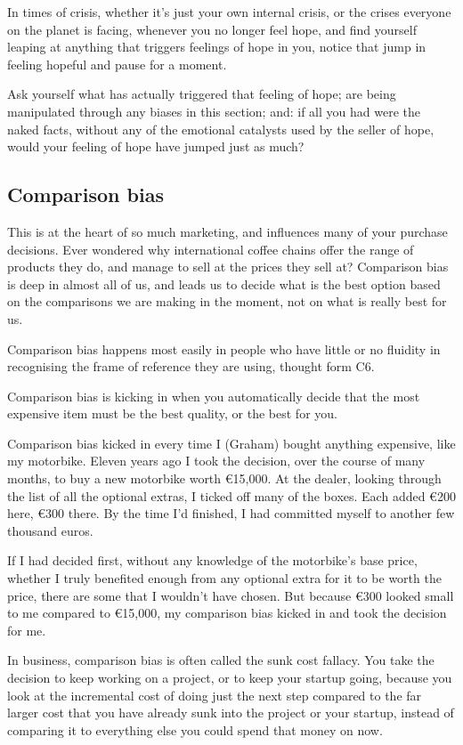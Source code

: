 In times of crisis, whether it's just your own internal crisis, or the crises everyone on the planet is facing, whenever you no longer feel hope, and find yourself leaping at anything that triggers feelings of hope in you, notice that jump in feeling hopeful and pause for a moment. 


Ask yourself what has actually triggered that feeling of hope; are being manipulated through any biases in this section; and: if all you had were the naked facts, without any of the emotional catalysts used by the seller of hope, would your feeling of hope have jumped just as much?


\subsection{Comparison bias}
This is at the heart of so much marketing, and influences many of your purchase decisions. Ever wondered why international coffee chains offer the range of products they do, and manage to sell at the prices they sell at? Comparison bias is deep in almost all of us, and leads us to decide what is the best option based on the comparisons we are making in the moment, not on what is really best for us.


Comparison bias happens most easily in people who have little or no fluidity in recognising the frame of reference they are using, thought form C6.


Comparison bias is kicking in when you automatically decide that the most expensive item must be the best quality, or the best for you.


Comparison bias kicked in every time I (Graham) bought anything expensive, like my motorbike. Eleven years ago I took the decision, over the course of many months, to buy a new motorbike worth €15,000. At the dealer, looking through the list of all the optional extras, I ticked off many of the boxes. Each added €200 here, €300 there. By the time I'd finished, I had committed myself to another few thousand euros.


If I had decided first, without any knowledge of the motorbike’s base price, whether I truly benefited enough from any optional extra for it to be worth the price, there are some that I wouldn’t have chosen. But because €300 looked small to me compared to €15,000, my comparison bias kicked in and took the decision for me.


In business, comparison bias is often called the sunk cost fallacy. You take the decision to keep working on a project, or to keep your startup going, because you look at the incremental cost of doing just the next step compared to the far larger cost that you have already sunk into the project or your startup, instead of comparing it to everything else you could spend that money on now. 


